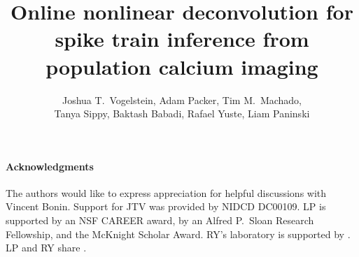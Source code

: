  
\usepackage{multicol}
\usepackage{hyperref}
\newcommand{\zzz}{z}
\newcommand{\az}{\argmax_{\bM \bC \geq \ve{0}}}
\newcommand{\anx}{\argmax_{n_t \in \mathbb{N}_0 \forall t}}
\newcommand{\foopsi}{fast }


\title{Online nonlinear deconvolution for spike train inference from population calcium imaging}

\author{Joshua T.~Vogelstein, Adam Packer, Tim M.~Machado, \\ Tanya Sippy, Baktash Babadi, Rafael Yuste, Liam Paninski}



\maketitle
 









\paragraph{Acknowledgments}

The authors would like to express appreciation for helpful discussions with Vincent Bonin.  Support for JTV was provided by NIDCD DC00109. LP is supported by an NSF CAREER award, by an Alfred P.\ Sloan Research Fellowship, and the McKnight Scholar Award. RY's laboratory is supported by .  LP and RY share .


%
%

%


\appendix


% 

